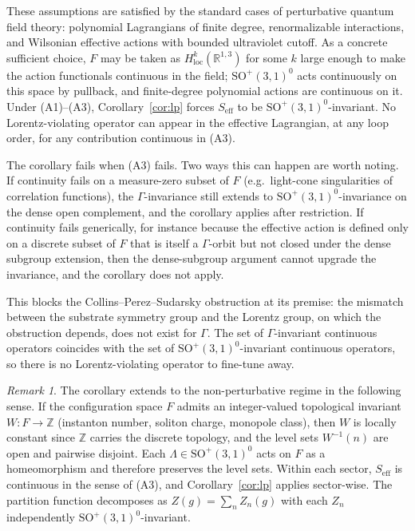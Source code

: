 \documentclass[11pt]{article}
\theoremstyle{remark}
\newtheorem*{remark}{Remark}
\begin{document}
These assumptions are satisfied by the standard cases of perturbative
quantum field theory: polynomial Lagrangians of finite degree,
renormalizable interactions, and Wilsonian effective actions with
bounded ultraviolet cutoff. As a concrete sufficient choice, $F$ may
be taken as $H^k_{\mathrm{loc}}(\mathbb{R}^{1,3})$ for some $k$ large
enough to make the action functionals continuous in the field;
$\mathrm{SO}^+(3,1)^0$ acts continuously on this space by pullback,
and finite-degree polynomial actions are continuous on it. Under
(A1)--(A3), Corollary~\ref{cor:lp} forces $S_{\mathrm{eff}}$ to be
$\mathrm{SO}^+(3,1)^0$-invariant. No Lorentz-violating operator can
appear in the effective Lagrangian, at any loop order, for any
contribution continuous in (A3).

The corollary fails when (A3) fails. Two ways this can happen are
worth noting. If continuity fails on a measure-zero subset of $F$
(e.g.\ light-cone singularities of correlation functions), the
$\Gamma$-invariance still extends to $\mathrm{SO}^+(3,1)^0$-invariance
on the dense open complement, and the corollary applies after
restriction. If continuity fails generically, for instance because
the effective action is defined only on a discrete subset of $F$ that
is itself a $\Gamma$-orbit but not closed under the dense subgroup
extension, then the dense-subgroup argument cannot upgrade the
invariance, and the corollary does not apply.

This blocks the Collins--Perez--Sudarsky obstruction at its premise:
the mismatch between the substrate symmetry group and the Lorentz
group, on which the obstruction depends, does not exist for $\Gamma$.
The set of $\Gamma$-invariant continuous operators coincides with the
set of $\mathrm{SO}^+(3,1)^0$-invariant continuous operators, so there
is no Lorentz-violating operator to fine-tune away.

\begin{remark}
The corollary extends to the non-perturbative regime in the following
sense. If the configuration space $F$ admits an integer-valued
topological invariant $W : F \to \mathbb{Z}$ (instanton number,
soliton charge, monopole class), then $W$ is locally constant since
$\mathbb{Z}$ carries the discrete topology, and the level sets
$W^{-1}(n)$ are open and pairwise disjoint. Each $\Lambda \in
\mathrm{SO}^+(3,1)^0$ acts on $F$ as a homeomorphism and therefore
preserves the level sets. Within each sector, $S_{\mathrm{eff}}$ is
continuous in the sense of (A3), and Corollary~\ref{cor:lp} applies
sector-wise. The partition function decomposes as $Z(g) = \sum_n
Z_n(g)$ with each $Z_n$ independently $\mathrm{SO}^+(3,1)^0$-invariant.
\end{remark}
\end{document}
